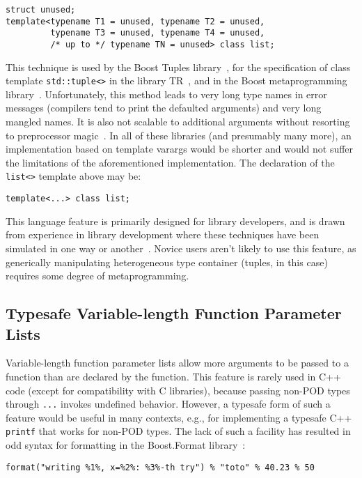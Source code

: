 \documentclass{article}
\begin{document}
\begin{verbatim}
struct unused;
template<typename T1 = unused, typename T2 = unused, 
         typename T3 = unused, typename T4 = unused, 
         /* up to */ typename TN = unused> class list;
\end{verbatim}

This technique is used by the Boost Tuples library~\cite{Tuples01},
for the specification of class template {\tt std::tuple<>} in the
library TR~\cite{Jarvi02}, and in the Boost metaprogramming
library~\cite{Gurtovoy02}. Unfortunately, this method leads to very
long type names in error messages (compilers tend to print the
defaulted arguments) and very long mangled names. It is also not
scalable to additional arguments without resorting to preprocessor
magic~\cite{Preprocessor01}. In all of these libraries (and presumably
many more), an implementation based on template varargs would be
shorter and would not suffer the limitations of the aforementioned
implementation. The declaration of the {\tt list<>} template above may
be:
\begin{verbatim}
template<...> class list;
\end{verbatim}

This language feature is primarily designed for library developers,
and is drawn from experience in library development where these
techniques have been simulated in one way or
another~\cite{Gurtovoy02,Lambda02,Tuples01,Function01,Bind01}. Novice
users aren't likely to use this feature, as generically manipulating
heterogeneous type container (tuples, in this case) requires some
degree of metaprogramming.

\subsection{Typesafe Variable-length Function Parameter Lists}
Variable-length function parameter lists allow more arguments to be
passed to a function than are declared by the function. This feature
is rarely used in C++ code (except for compatibility with C
libraries), because passing non-POD types through {\tt ...} invokes
undefined behavior. However, a typesafe form of such a feature would
be useful in many contexts, e.g., for implementing a typesafe C++ {\tt
  printf} that works for non-POD types. The lack of such a facility
has resulted in odd syntax for formatting in the Boost.Format
library~\cite{Krempp02}:
\begin{verbatim}
format("writing %1%, x=%2%: %3%-th try") % "toto" % 40.23 % 50
\end{verbatim}
\end{document}
